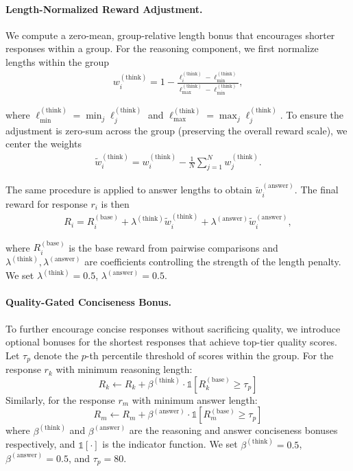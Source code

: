 \paragraph{Length-Normalized Reward Adjustment.} We compute a zero-mean, group-relative length bonus that encourages shorter responses within a group. For the reasoning component, we first normalize lengths within the group
\begin{align}
    w_i^{(\text{think})} = 1 - \frac{\ell_i^{(\text{think})} - \ell_{\min}^{(\text{think})}}{\ell_{\max}^{(\text{think})} - \ell_{\min}^{(\text{think})}},
\end{align}

where $\ell_{\min}^{(\text{think})} = \min_j \ell_j^{(\text{think})}$ and $\ell_{\max}^{(\text{think})} = \max_j \ell_j^{(\text{think})}$. To ensure the adjustment is zero-sum across the group (preserving the overall reward scale), we center the weights
\begin{align}
    \tilde{w}_i^{(\text{think})} = w_i^{(\text{think})} - \frac{1}{N}\sum_{j=1}^{N} w_j^{(\text{think})}.
\end{align}

The same procedure is applied to answer lengths to obtain $\tilde{w}_i^{(\text{answer})}$. The final reward for response $r_i$ is then
\begin{align}
    R_i = R_i^{(\text{base})} + \lambda^{(\text{think})} \tilde{w}_i^{(\text{think})} + \lambda^{(\text{answer})} \tilde{w}_i^{(\text{answer})},
\end{align}

where $R_i^{(\text{base})}$ is the base reward from pairwise comparisons and $\lambda^{(\text{think})}, \lambda^{(\text{answer})}$ are  coefficients controlling the strength of the length penalty. We set $\lambda^{(\text{think})}=0.5$, $\lambda^{(\text{answer})}=0.5$.
\paragraph{Quality-Gated Conciseness Bonus.} To further encourage concise responses without sacrificing quality, we introduce optional bonuses for the shortest responses that achieve top-tier quality scores. Let $\tau_p$ denote the $p$-th percentile threshold of scores within the group. For the response $r_k$ with minimum reasoning length:
$$R_k \leftarrow R_k + \beta^{(\text{think})} \cdot \mathbb{1}\left[R_k^{(\text{base})} \geq \tau_p\right]$$
Similarly, for the response $r_m$ with minimum answer length:
$$R_m \leftarrow R_m + \beta^{(\text{answer})} \cdot \mathbb{1}\left[R_m^{(\text{base})} \geq \tau_p\right]$$
where $\beta^{(\text{think})}$ and $\beta^{(\text{answer})}$ are the reasoning and answer conciseness bonuses respectively, and $\mathbb{1}[\cdot]$ is the indicator function. We set $\beta^{(\text{think})}=0.5$, $\beta^{(\text{answer})}=0.5$, and $\tau_p=80$.

